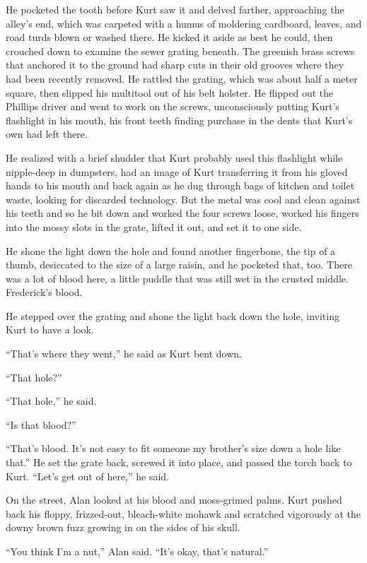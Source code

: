 He pocketed the tooth before Kurt saw it and delved farther,
approaching the alley's end, which was carpeted with a humus of
moldering cardboard, leaves, and road turds blown or washed there.  He
kicked it aside as best he could, then crouched down to examine the
sewer grating beneath.  The greenish brass screws that anchored it to
the ground had sharp cuts in their old grooves where they had been
recently removed.  He rattled the grating, which was about half a
meter square, then slipped his multitool out of his belt holster.  He
flipped out the Phillips driver and went to work on the screws,
unconsciously putting Kurt's flashlight in his mouth, his front teeth
finding purchase in the dents that Kurt's own had left there.

He realized with a brief shudder that Kurt probably used this
flashlight while nipple-deep in dumpsters, had an image of Kurt
transferring it from his gloved hands to his mouth and back again as
he dug through bags of kitchen and toilet waste, looking for discarded
technology.  But the metal was cool and clean against his teeth and so
he bit down and worked the four screws loose, worked his fingers into
the mossy slots in the grate, lifted it out, and set it to one side.

He shone the light down the hole and found another fingerbone, the tip
of a thumb, desiccated to the size of a large raisin, and he pocketed
that, too.  There was a lot of blood here, a little puddle that was
still wet in the crusted middle.  Frederick's blood.

He stepped over the grating and shone the light back down the hole,
inviting Kurt to have a look.

``That's where they went,'' he said as Kurt bent down.

``That hole?''

``That hole,'' he said.

``Is that blood?''

``That's blood.  It's not easy to fit someone my brother's size down a
hole like that.'' He set the grate back, screwed it into place, and
passed the torch back to Kurt.  ``Let's get out of here,'' he said.

On the street, Alan looked at his blood and moss-grimed palms.  Kurt
pushed back his floppy, frizzed-out, bleach-white mohawk and scratched
vigorously at the downy brown fuzz growing in on the sides of his
skull.

``You think I'm a nut,'' Alan said.  ``It's okay, that's natural.''

